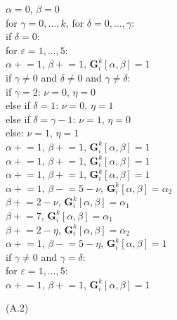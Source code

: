 \begin{minipage}{\textwidth}\ttfamily\small
$\alpha = 0$, $\beta = 0$ \\
for $\gamma = 0, \ldots, k$, for $\delta = 0, \ldots, \gamma$: \\
\hphantom{ww}if $\delta = 0$: \\
\hphantom{wwww}for $\varepsilon = 1, \ldots, 5$: \\
\hphantom{wwwwww}$\alpha \mathrel{+}= 1$, $\beta \mathrel{+}= 1$,
$\boldsymbol{G}_i^k[\alpha, \beta] = 1$ \\
\hphantom{ww}if $\gamma \neq 0$ and $\delta \neq 0$ and $\gamma \neq \delta$: \\
\hphantom{wwww}if $\gamma = 2$: $\nu = 0$, $\eta = 0$ \\
\hphantom{wwww}else if $\delta = 1$: $\nu = 0$, $\eta = 1$ \\
\hphantom{wwww}else if $\delta = \gamma - 1$: $\nu = 1$, $\eta = 0$ \\
\hphantom{wwww}else: $\nu = 1$, $\eta = 1$ \\
\hphantom{wwww}$\alpha \mathrel{+}= 1$, $\beta \mathrel{+}= 1$,
$\boldsymbol{G}_i^k[\alpha, \beta] = 1$ \\
\hphantom{wwww}$\alpha \mathrel{+}= 1$, $\beta \mathrel{+}= 1$,
$\boldsymbol{G}_i^k[\alpha, \beta] = 1$ \\
\hphantom{wwww}$\alpha \mathrel{+}= 1$, $\beta \mathrel{+}= 1$,
$\boldsymbol{G}_i^k[\alpha, \beta] = 1$ \\
\hphantom{wwww}$\alpha \mathrel{+}= 1$, $\beta \mathrel{-}= 5 - \nu$,
$\boldsymbol{G}_i^k[\alpha, \beta] = \alpha_2$ \\
\hphantom{wwwwwwwwwwww}$\beta \mathrel{+}= 2 - \nu$,
$\boldsymbol{G}_i^k[\alpha, \beta] = \alpha_1$ \\
\hphantom{wwwwwwwwwwww}$\beta \mathrel{+}= 7$,
$\boldsymbol{G}_i^k[\alpha, \beta] = \alpha_1$ \\
\hphantom{wwwwwwwwwwww}$\beta \mathrel{+}= 2 - \eta$,
$\boldsymbol{G}_i^k[\alpha, \beta] = \alpha_2$ \\
\hphantom{wwww}$\alpha \mathrel{+}= 1$, $\beta \mathrel{-}= 5 - \eta$,
$\boldsymbol{G}_i^k[\alpha, \beta] = 1$ \\
\hphantom{ww}if $\gamma \neq 0$ and $\gamma = \delta$: \\
\hphantom{wwww}for $\varepsilon = 1, \ldots, 5$: \\
\hphantom{wwwwww}$\alpha \mathrel{+}= 1$, $\beta \mathrel{+}= 1$,
$\boldsymbol{G}_i^k[\alpha, \beta] = 1$ \\
\end{minipage}
\hfill (A.2)

